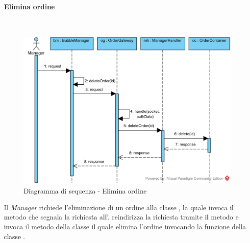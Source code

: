 \paragraph{Elimina ordine}\mbox{} \\
\nopagebreak
\begin{figure}[H]
	\centering
	\includegraphics[width=15cm]{./diagrammi/sequenza/elimina_ordine.png}
	\caption{Diagramma di sequenza - Elimina ordine}
\end{figure}
Il \textit{Manager} richiede l'eliminazione di un ordine alla classe , la quale invoca il metodo  che segnala la richiesta all'.  reindirizza la richiesta tramite il metodo  e invoca il metodo  della classe  il quale elimina l'ordine invocando la funzione  della classe .